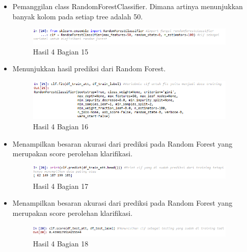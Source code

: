 \begin{itemize}
\item Pemanggilan class RandomForestClassifier. Dimana artinya menunjukkan banyak kolom pada setiap tree adalah 50.

\begin{figure}[H]
\centerline{\includegraphics[width=10cm]{figures/1174087/3/21.png}}
\caption{Hasil 4 Bagian 15}
\label{labelgambar}
\end{figure}

\item Menunjukkan hasil prediksi dari Random Forest.

\begin{figure}[H]
\centerline{\includegraphics[width=10cm]{figures/1174087/3/22.png}}
\caption{Hasil 4 Bagian 16}
\label{labelgambar}
\end{figure}

\item Menampilkan besaran akurasi dari prediksi pada Random Forest yang merupakan score perolehan klarifikasi.

\begin{figure}[H]
\centerline{\includegraphics[width=10cm]{figures/1174087/3/23.png}}
\caption{Hasil 4 Bagian 17}
\label{labelgambar}
\end{figure}

\item Menampilkan besaran akurasi dari prediksi pada Random Forest yang merupakan score perolehan klarifikasi.

\begin{figure}[H]
\centerline{\includegraphics[width=10cm]{figures/1174087/3/24.png}}
\caption{Hasil 4 Bagian 18}
\label{labelgambar}
\end{figure}
\end{itemize}

